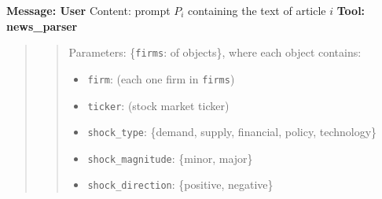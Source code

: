\begin{algorithm}[H]
\begin{algorithmic}[1]
    \State \textbf{Message: User} \Comment{\scalebox{0.9}{\textcolor{lightgray}{User provides the article text as input}}}
    \Statex \hspace{1cm} Content: prompt $P_i$ containing the text of article $i$
    \State \textbf{Tool: news\_parser} 
%    
\begin{quote}
\begin{quote}
Parameters: \{\texttt{firms}:  of objects\}, where each object contains:
            \begin{itemize}
                \item \texttt{firm}: \hspace{2.3cm}  (each one firm in \texttt{firms})
                \item \texttt{ticker}: \hspace{1.9cm}  (stock market ticker)
                \item \texttt{shock\_type}: \hspace{1cm} \{demand, supply, financial, policy, technology\}
                \item \texttt{shock\_magnitude}: \hspace{0cm} \{minor, major\}
                \item \texttt{shock\_direction}: \hspace{0.cm} \{positive, negative\}
            \end{itemize} 
\end{quote} 
\end{quote} 
 

\end{algorithmic}
\end{algorithm}
